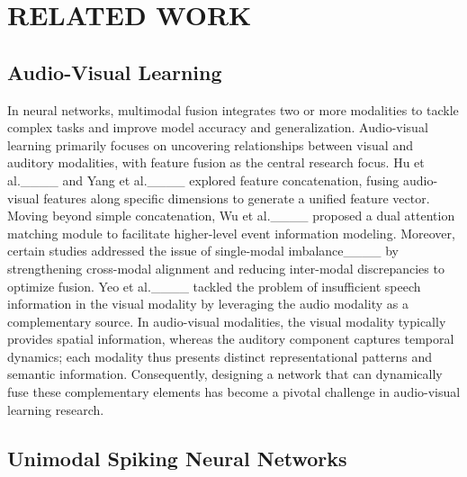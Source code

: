 \section{RELATED WORK}
\subsection{Audio-Visual Learning}
In neural networks, multimodal fusion integrates two or more modalities to tackle complex tasks and improve model accuracy and generalization. Audio-visual learning primarily focuses on uncovering relationships between visual and auditory modalities, with feature fusion as the central research focus. Hu et al.____ and Yang et al.____ explored feature concatenation, fusing audio-visual features along specific dimensions to generate a unified feature vector. Moving beyond simple concatenation, Wu et al.____ proposed a dual attention matching module to facilitate higher-level event information modeling. Moreover, certain studies addressed the issue of single-modal imbalance____ by strengthening cross-modal alignment and reducing inter-modal discrepancies to optimize fusion. Yeo et al.____ tackled the problem of insufficient speech information in the visual modality by leveraging the audio modality as a complementary source. In audio-visual modalities, the visual modality typically provides spatial information, whereas the auditory component captures temporal dynamics; each modality thus presents distinct representational patterns and semantic information. Consequently, designing a network that can dynamically fuse these complementary elements has become a pivotal challenge in audio-visual learning research.

\subsection{Unimodal Spiking Neural Networks}

